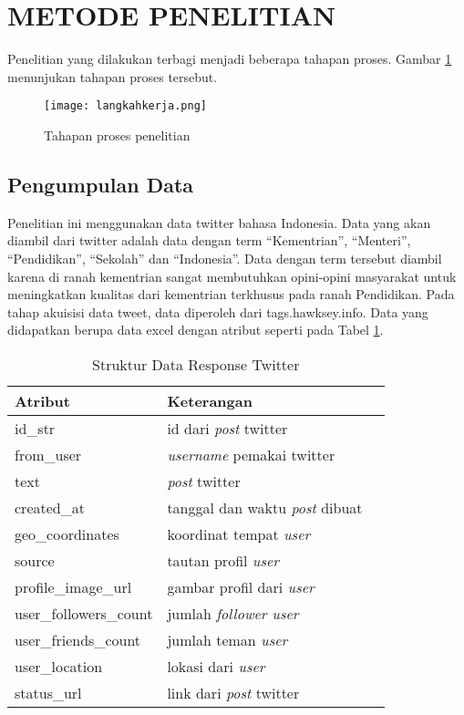 
\section*{METODE PENELITIAN}

Penelitian yang dilakukan terbagi menjadi beberapa tahapan proses. Gambar \ref{fig:tahapan} menunjukan tahapan proses tersebut.

\begin{figure}[h!] %
	\centering
	\texttt{[image: langkahkerja.png]}
	\caption{Tahapan proses penelitian}
	\label{fig:tahapan}
\end{figure}

\subsection*{Pengumpulan Data}

Penelitian ini menggunakan data twitter bahasa Indonesia. Data yang akan diambil dari twitter adalah data dengan term “Kementrian”, “Menteri”, “Pendidikan”, “Sekolah” dan “Indonesia”. Data dengan term tersebut diambil karena di ranah kementrian sangat membutuhkan opini-opini masyarakat untuk meningkatkan kualitas dari kementrian terkhusus pada ranah Pendidikan. 
Pada tahap akuisisi data tweet, data diperoleh dari tags.hawksey.info. Data yang didapatkan berupa data excel dengan atribut seperti pada Tabel \ref{tab:strukturdatatwitter}.

\begin{table}[hbt]
	\caption{Struktur Data Response Twitter}
	\centering
	\begin{tabular}{llr}
		
		\cmidrule(r){1-2}
		Atribut & Keterangan \\
		\midrule
		id\_str & id dari \textit{post} twitter \\
		from\_user & \textit{username} pemakai twitter \\
		text & \textit{post} twitter \\
		created\_at & tanggal dan waktu \textit{post} dibuat \\
		geo\_coordinates & koordinat tempat \textit{user} \\
		source & tautan profil \textit{user} \\
		profile\_image\_url & gambar profil dari \textit{user} \\
		user\_followers\_count & jumlah \textit{follower user} \\
		user\_friends\_count & jumlah teman \textit{user} \\
		user\_location & lokasi dari \textit{user} \\
		status\_url & link dari \textit{post} twitter \\
		
		\bottomrule
	\end{tabular}
	\label{tab:strukturdatatwitter}
\end{table}


